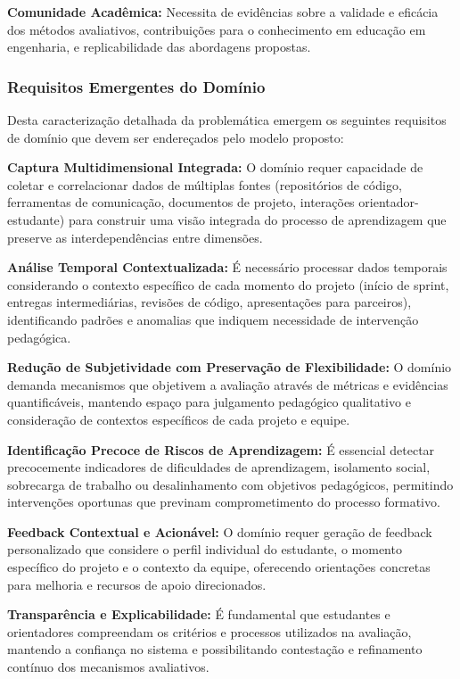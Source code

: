 \documentclass[english, spanish, brazilian]{modelo_dt}
\begin{document}
\textbf{Comunidade Acadêmica:} Necessita de evidências sobre a validade e eficácia dos métodos avaliativos, contribuições para o conhecimento em educação em engenharia, e replicabilidade das abordagens propostas.

\subsubsection{Requisitos Emergentes do Domínio}

Desta caracterização detalhada da problemática emergem os seguintes requisitos
de domínio que devem ser endereçados pelo modelo proposto:

\textbf{Captura Multidimensional Integrada:} O domínio requer capacidade de coletar e correlacionar dados de múltiplas fontes (repositórios de código, ferramentas de comunicação, documentos de projeto, interações orientador-estudante) para construir uma visão integrada do processo de aprendizagem que preserve as interdependências entre dimensões.

\textbf{Análise Temporal Contextualizada:} É necessário processar dados temporais considerando o contexto específico de cada momento do projeto (início de sprint, entregas intermediárias, revisões de código, apresentações para parceiros), identificando padrões e anomalias que indiquem necessidade de intervenção pedagógica.

\textbf{Redução de Subjetividade com Preservação de Flexibilidade:} O domínio demanda mecanismos que objetivem a avaliação através de métricas e evidências quantificáveis, mantendo espaço para julgamento pedagógico qualitativo e consideração de contextos específicos de cada projeto e equipe.

\textbf{Identificação Precoce de Riscos de Aprendizagem:} É essencial detectar precocemente indicadores de dificuldades de aprendizagem, isolamento social, sobrecarga de trabalho ou desalinhamento com objetivos pedagógicos, permitindo intervenções oportunas que previnam comprometimento do processo formativo.

\textbf{Feedback Contextual e Acionável:} O domínio requer geração de feedback personalizado que considere o perfil individual do estudante, o momento específico do projeto e o contexto da equipe, oferecendo orientações concretas para melhoria e recursos de apoio direcionados.

\textbf{Transparência e Explicabilidade:} É fundamental que estudantes e orientadores compreendam os critérios e processos utilizados na avaliação, mantendo a confiança no sistema e possibilitando contestação e refinamento contínuo dos mecanismos avaliativos.
\end{document}
